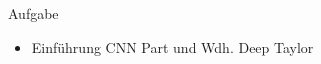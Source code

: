 \begin{frame}{Aufgabe}
\begin{itemize}
\item Einführung CNN Part und Wdh. Deep Taylor
\end{itemize}
\end{frame}